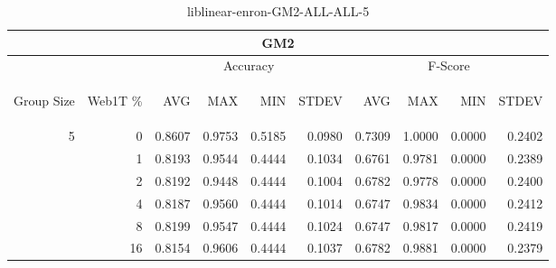 \begin{center}
\begin{table}[htbp]
\begin{tabular}{ | r | r | r | r | r | r | r | r | r | r |}
\hline
\multicolumn{10}{|c|}{GM2}\\
\hline
 & & \multicolumn{4}{|c|}{Accuracy} & \multicolumn{4}{|c|}{F-Score}\\ \cline{3-10}
\begin{sideways}Group Size\end{sideways} & \begin{sideways}Web1T \%\end{sideways} & \begin{sideways}AVG\end{sideways} & \begin{sideways}MAX\end{sideways} & \begin{sideways}MIN\end{sideways} & \begin{sideways}STDEV\end{sideways} & \begin{sideways}AVG\end{sideways} & \begin{sideways}MAX\end{sideways} & \begin{sideways}MIN\end{sideways} & \begin{sideways}STDEV\end{sideways}\\
\hline
\multirow{6}{*}{5}
 & 0 & 0.8607 & 0.9753 & 0.5185 & 0.0980 & 0.7309 & 1.0000 & 0.0000 & 0.2402\\ \cline{2-10}
 & 1 & 0.8193 & 0.9544 & 0.4444 & 0.1034 & 0.6761 & 0.9781 & 0.0000 & 0.2389\\ \cline{2-10}
 & 2 & 0.8192 & 0.9448 & 0.4444 & 0.1004 & 0.6782 & 0.9778 & 0.0000 & 0.2400\\ \cline{2-10}
 & 4 & 0.8187 & 0.9560 & 0.4444 & 0.1014 & 0.6747 & 0.9834 & 0.0000 & 0.2412\\ \cline{2-10}
 & 8 & 0.8199 & 0.9547 & 0.4444 & 0.1024 & 0.6747 & 0.9817 & 0.0000 & 0.2419\\ \cline{2-10}
 & 16 & 0.8154 & 0.9606 & 0.4444 & 0.1037 & 0.6782 & 0.9881 & 0.0000 & 0.2379\\ \cline{2-10}
\hline
\end{tabular}
\caption{liblinear-enron-GM2-ALL-ALL-5}
\end{table}
\end{center}

